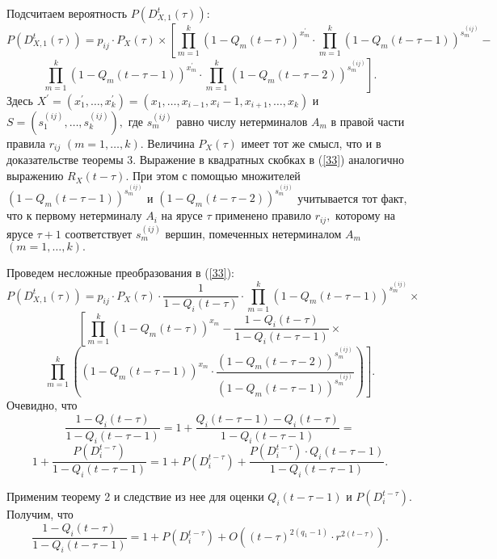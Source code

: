 \documentclass[12pt,russian]{article}
\begin{document}
{Подсчитаем вероятность $P\left(D_{X,1}^t(\tau)\right):$
$$
P\left(D_{X,1}^t(\tau)\right)=p_{ij} \cdot
P_X(\tau) \times
\left[\prod_{m=1}^k \left(1-Q_m(t-\tau)\right)^{x_m^{\prime}}\cdot
\prod_{m=1}^k \left(1-Q_m(t-\tau-1)\right)^{s_m^{(ij)}}- \right.
$$
\begin{equation}
\left. \prod_{m=1}^k \left(1-Q_m(t-\tau-1)\right)^{x_m^{\prime}}\cdot
\prod_{m=1}^k \left(1-Q_m(t-\tau-2)\right)^{s_m^{(ij)}}\right].
\label{33}
\end{equation}
Здесь $X^{\prime}=(x_1^{\prime},\ldots,x_k^{\prime})=
(x_1,\ldots,x_{i-1},x_i-1,x_{i+1},\ldots, x_k)$ и
$S=(s_1^{(ij)}, \ldots, s_k^{(ij)}),$ где $s_m^{(ij)}$ равно
числу нетерминалов $A_m$ в правой части правила $r_{ij}$ $(m=1,\ldots, k).$
Величина $P_X(\tau)$ имеет тот же смысл, что и в доказательстве теоремы 3.
Выражение в квадратных скобках в (\ref{33})
аналогично выражению $R_X(t-\tau).$  При этом
с помощью множителей $\left(1-Q_m(t-\tau-1)\right)^{s_m^{(ij)}}$ и
$\left(1-Q_m(t-\tau-2)\right)^{s_m^{(ij)}}$
учитывается тот факт, что к первому нетерминалу $A_i$ на ярусе $\tau$
применено правило $r_{ij},$ которому на ярусе $\tau+1$ соответствует
$s_m^{(ij)}$ вершин, помеченных нетерминалом $A_m$ $(m=1, \ldots, k).$

Проведем несложные преобразования в (\ref{33}):
$$
P\left(D_{X,1}^t(\tau)\right)=p_{ij} \cdot P_X(\tau) \cdot
\frac{1}{1-Q_i(t-\tau)}\cdot \prod_{m=1}^k \left(1-Q_m(t-\tau-1)\right)
^{s_m^{(ij)}}\times
$$
$$
\left[\prod_{m=1}^k \left(1-Q_m(t-\tau)\right)^{x_m}-
\frac{1-Q_i(t-\tau)}{1-Q_i(t-\tau-1)}\times \right.
$$
$$
\left. \prod_{m=1}^k \left(\left(1-Q_m(t-\tau-1)\right)^{x_m} \cdot
\frac{\left(1-Q_m(t-\tau-2)\right)^{s_m^{(ij)}}}
{\left(1-Q_m(t-\tau-1)\right)^{s_m^{(ij)}}}\right)\right].
$$
Очевидно, что
$$
\frac{1-Q_i(t-\tau)}{1-Q_i(t-\tau-1)}=
1+\frac{Q_i(t-\tau-1)-Q_i(t-\tau)}{1-Q_i(t-\tau-1)}=
$$
$$
1+\frac{P(D_i^{t-\tau})}{1-Q_i(t-\tau-1)}=
1+P(D_i^{t-\tau})+\frac{P(D_i^{t-\tau})\cdot Q_i(t-\tau-1) }{1-Q_i(t-\tau-1)}.
$$

Применим теорему 2 и следствие из нее для оценки $Q_i(t-\tau-1)$ и $P(D_i^{t-\tau})$.
Получим, что
$$
\frac{1-Q_i(t-\tau)}{1-Q_i(t-\tau-1)}= 1+P(D_i^{t-\tau})+O((t-\tau)^{2(q_1-1)}\cdot r^{2(t-\tau)}).
$$

}
\end{document}
